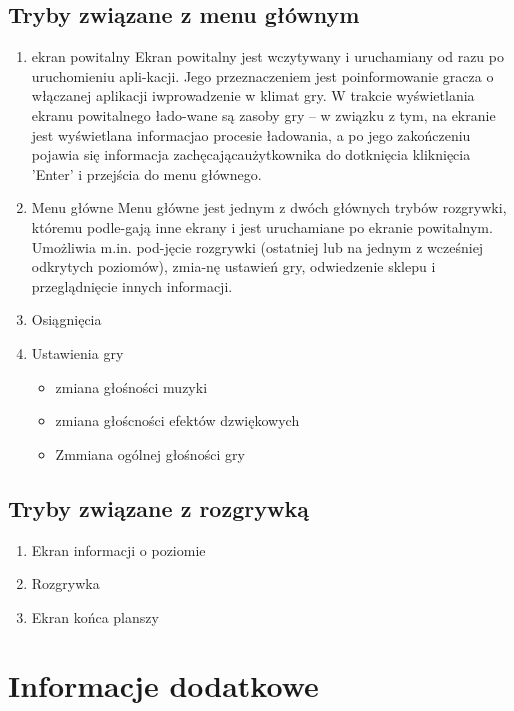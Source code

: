 \documentclass{article}
\begin{document}
    \subsection{Tryby związane z menu głównym}
    \begin{enumerate}
        \item ekran powitalny
        Ekran powitalny jest wczytywany i uruchamiany od razu po uruchomieniu apli-kacji. Jego przeznaczeniem jest poinformowanie gracza o włączanej aplikacji iwprowadzenie w klimat gry. W trakcie wyświetlania ekranu powitalnego łado-wane są zasoby gry – w związku z tym, na ekranie jest wyświetlana informacjao procesie ładowania, a po jego zakończeniu pojawia się informacja zachęcającaużytkownika do dotknięcia kliknięcia 'Enter' i przejścia do menu głównego.
        \item Menu główne
        Menu główne jest jednym z dwóch głównych trybów rozgrywki, któremu podle-gają inne ekrany i jest uruchamiane po ekranie powitalnym. Umożliwia m.in. pod-jęcie rozgrywki (ostatniej lub na jednym z wcześniej odkrytych poziomów), zmia-nę  ustawień  gry,  odwiedzenie  sklepu  i  przeglądnięcie  innych  informacji. 
        \item Osiągnięcia
        \item Ustawienia gry
        \begin{itemize}
            \item zmiana głośności muzyki
            \item zmiana głoścności efektów dzwiękowych
            \item Zmmiana ogólnej głośności gry
        \end{itemize}
        
    \end{enumerate}
    
    \subsection{Tryby związane z rozgrywką}
    \begin{enumerate}
        \item Ekran informacji o poziomie
        \item Rozgrywka
        \item Ekran końca planszy
        
    \end{enumerate}
        
    
    
    \newpage
    
\section{Informacje dodatkowe}
\end{document}
